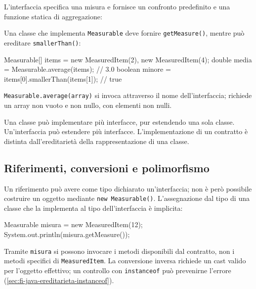\begin{example}
L'interfaccia specifica una misura e fornisce un confronto
predefinito e una funzione statica di aggregazione:

\clearpage

\noindent
\begin{minipage}{\linewidth}

\end{minipage}

Una classe che implementa \texttt{Measurable} deve fornire
\texttt{getMeasure()}, mentre può ereditare \texttt{smallerThan()}:



\begin{unipdcode}[language=Java]
Measurable[] items = {new MeasuredItem(2), new MeasuredItem(4)};
double media = Measurable.average(items); // 3.0
boolean minore = items[0].smallerThan(items[1]); // true
\end{unipdcode}

\texttt{Measurable.average(array)} si invoca attraverso il
nome dell'interfaccia; richiede un array non vuoto e non nullo,
con elementi non nulli.
\end{example}

Una classe può implementare più interfacce, pur estendendo una
sola classe. Un'interfaccia può estendere più interfacce.
L'implementazione di un contratto è distinta dall'ereditarietà
della rappresentazione di una classe.

\clearpage

\subsection{Riferimenti, conversioni e polimorfismo}
\label{sec:fi-java-interfacce-riferimenti}

Un riferimento può avere come tipo dichiarato un'interfaccia;
non è però possibile costruire un oggetto mediante
\lstinline|new Measurable()|. L'assegnazione dal tipo di una
classe che la implementa al tipo dell'interfaccia è implicita:

\begin{unipdcode}[language=Java]
Measurable misura = new MeasuredItem(12);
System.out.println(misura.getMeasure());
\end{unipdcode}

Tramite \texttt{misura} si possono invocare i metodi disponibili
dal contratto, non i metodi specifici di \texttt{MeasuredItem}.
La conversione inversa richiede un cast valido per l'oggetto
effettivo; un controllo con \texttt{instanceof} può prevenirne
l'errore (\cref{sec:fi-java-ereditarieta-instanceof}).

